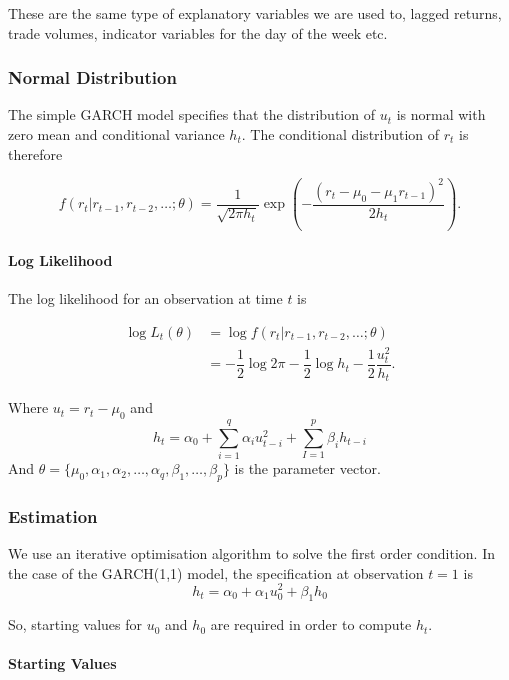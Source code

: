 \documentclass[11pt]{article}
\begin{document}
These are the same type of explanatory variables we are used to, lagged returns, trade volumes, indicator variables for the day of the week etc.

\subsubsection{Normal Distribution}

The simple GARCH model specifies that the distribution of $u_t$ is normal with zero mean and conditional variance $h_t$. The conditional distribution of $r_t$ is therefore

\[f(r_t|r_{t-1}, r_{t-2}, \ldots; \theta) = \dfrac{1}{\sqrt{2\pi h_t}} \exp \left( - \dfrac{(r_t - \mu_0 - \mu_1 r_{t-1})^2}{2h_t}\right).\]

\paragraph{Log Likelihood} \mbox{}

The log likelihood for an observation at time $t$ is

\begin{equation}
\begin{aligned}
\log L_t(\theta) &= \log f(r_t|r_{t-1}, r_{t-2}, \ldots; \theta) \\
	&= -\dfrac{1}{2} \log 2\pi - \dfrac{1}{2} \log h_t - \dfrac{1}{2} \dfrac{u_t^2}{h_t}.
\end{aligned}
\end{equation}

Where $u_t = r_t - \mu_0$ and
\[h_t = \alpha_0 + \sum_{i=1}^q \alpha_i u_{t-i}^2 + \sum_{I=1}^p \beta_i h_{t-i}\]
And $\theta = \{\mu_0, \alpha_1, \alpha_2,\ldots, \alpha_q, \beta_1, \ldots, \beta_p\}$ is the parameter vector. 

\subsubsection{Estimation}

We use an iterative optimisation algorithm to solve the first order condition. In the case of the GARCH(1,1) model, the specification at observation $t=1$ is
\[h_t = \alpha_0 + \alpha_1 u_0^2 + \beta_1 h_0 \]

So, starting values for $u_0$ and $h_0$ are required in order to compute $h_t$.

\paragraph{Starting Values}
\end{document}
